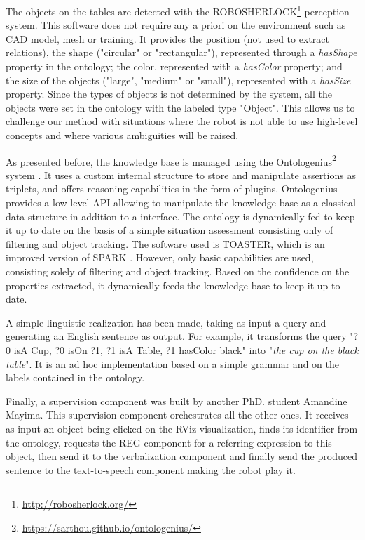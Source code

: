 \documentclass[a4paper,11pt,twoside]{StyleThese}
\begin{document}
The objects on the tables are detected with the ROBOSHERLOCK\footnote{\url{http://robosherlock.org/}} \cite{beetz2015robosherlock} perception system. This software does not require any a priori on the environment such as CAD model, mesh or training. 
It provides the position (not used to extract relations), the shape ("circular" or "rectangular"), represented through a \textit{hasShape} property in the ontology; the color, represented with a \textit{hasColor} property; and the size of the objects ("large", "medium" or "small"), represented with a \textit{hasSize} property. Since the types of objects is not determined by the system, all the objects were set in the ontology with the labeled type "Object". This allows us to challenge our method with situations where the robot is not able to use high-level concepts and where various ambiguities will be raised.

As presented before, the knowledge base is managed using the Ontologenius\footnote{\url{https://sarthou.github.io/ontologenius/}} system \cite{sarthou2019ontologenius}. 
It uses a custom internal structure to store and manipulate assertions as triplets, and offers reasoning capabilities in the form of plugins. Ontologenius provides a low level API allowing to manipulate the knowledge base as a classical data structure in addition to a \sparql{} interface.
The ontology is dynamically fed to keep it up to date on the basis of a simple situation assessment consisting only of filtering and object tracking. The software used is TOASTER, which is an improved version of SPARK \cite{milliez2014framework}. However, only basic capabilities are used, consisting solely of filtering and object tracking. Based on the confidence on the properties extracted, it dynamically feeds the knowledge base to keep it up to date.

A simple linguistic realization has been made, taking as input a \sparql{} query and generating an English sentence as output. For example, it transforms the query "?0 isA Cup, ?0 isOn ?1, ?1 isA Table, ?1 hasColor black" into "\textit{the cup on the black table}". It is an ad hoc implementation based on a simple grammar and on the labels contained in the ontology. 

Finally, a supervision component was built by another PhD. student Amandine Mayima. This supervision component orchestrates all the other ones. It receives as input an object being clicked on the RViz visualization, finds its identifier from the ontology, requests the REG component for a referring expression to this object, then send it to the verbalization component and finally send the produced sentence to the text-to-speech component making the robot play it.
\end{document}
